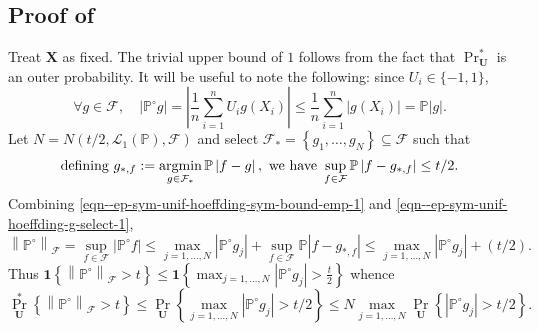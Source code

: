 \subsection{Proof of \texorpdfstring{%
}{Lemma
\ref{lem--ep-sym-unif-hoeffding-cond}}}
\label{sec--prf--lem--ep-sym-unif-hoeffding-cond}

Treat \(\mathbf{X}\) as fixed.
The trivial upper bound of \(1\) follows from the fact that
\(\Pr_{\mathbf{U}}^{\ast}\) is an outer probability.
It will be useful to note the following: since \(U_{i} \in \{- 1, 1\}\),
\begin{equation}
  \forall g \in \mathcal{F}, \quad \left| \mathbb{P}^{\circ} g \right| = \left|
  \frac{1}{n} \sum_{i = 1}^{n} U_{i} g \left( X_{i} \right) \right| \leq
  \frac{1}{n} \sum_{i = 1}^{n} \left| g \left( X_{i} \right) \right| =
  \mathbb{P} |g|.
  \label{eqn--ep-sym-unif-hoeffding-sym-bound-emp-1}
\end{equation}
Let \(N = N \left( t / 2, \mathscr{L}_{1} (\mathbb{P}),
\mathcal{F} \right)\) and select \(\mathcal{F}_{\ast} = \left\{ g_{1}, \dots,
g_{N} \right\} \subseteq \mathcal{F}\) such that
\begin{equation}
  \text{defining } g_{\ast, f} := \operatorname*{argmin}_{g \in \mathcal{F}_{\ast}}
  \mathbb{P} \left| f - g \right|, \text{ we have } \sup_{f \in \mathcal{F}}
  \mathbb{P} \left| f - g_{\ast, f} \right| \leq t / 2.
  \label{eqn--ep-sym-unif-hoeffding-g-select-1}
\end{equation}
Combining \eqref{eqn--ep-sym-unif-hoeffding-sym-bound-emp-1} and
\eqref{eqn--ep-sym-unif-hoeffding-g-select-1},
\begin{equation*}
  \left\| \mathbb{P}^{\circ} \right\|_{\mathcal{F}} = \sup_{f \in \mathcal{F}}
  \left| \mathbb{P}^{\circ} f \right| \leq \max_{j = 1, \dots, N} \left|
  \mathbb{P}^{\circ} g_{j} \right| + \sup_{f \in \mathcal{F}} \mathbb{P} \left|
  f - g_{\ast, f} \right| \leq \max_{j = 1, \dots, N} \left| \mathbb{P}^{\circ}
  g_{j} \right| + (t / 2).
\end{equation*}
Thus \(\mathbf{1} \left\{ \left\| \mathbb{P}^{\circ} \right\|_{\mathcal{F}} > t
\right\} \leq \mathbf{1} \left\{ \max_{j = 1, \dots, N} \left|
\mathbb{P}^{\circ} g_{j} \right| > \frac{t}{2} \right\}\) whence
\begin{equation*}
  \Pr_{\mathbf{U}}^{\ast} \left\{ \left\| \mathbb{P}^{\circ}
  \right\|_{\mathcal{F}} > t \right\} \leq \Pr_{\mathbf{U}} \left\{ \max_{j = 1,
  \dots, N} \left| \mathbb{P}^{\circ} g_{j} \right| > t / 2 \right\} \leq
  N \max_{j = 1, \dots, N} \Pr_{\mathbf{U}} \left\{ \left| \mathbb{P}^{\circ}
  g_{j} \right| > t / 2 \right\}.
\end{equation*}
